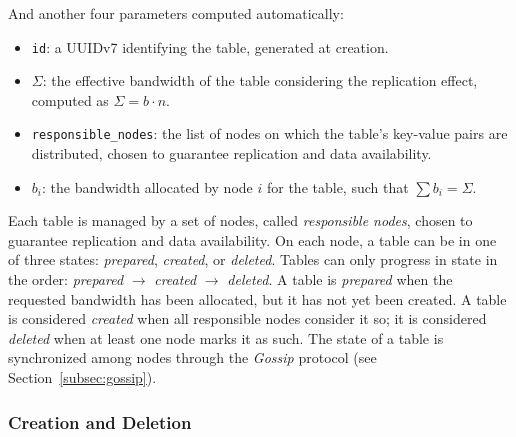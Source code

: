 And another four parameters computed automatically:
\begin{itemize}
    \item \texttt{id}: a UUIDv7 identifying the table, generated at creation.
    \item $\Sigma$: the effective bandwidth of the table considering the replication effect, computed as $\displaystyle \Sigma = b \cdot n$.
    \item \texttt{responsible\_nodes}: the list of nodes on which the table's key-value pairs are distributed, chosen to guarantee replication and data availability.
    \item $b_i$: the bandwidth allocated by node $i$ for the table, such that $\displaystyle \sum b_i = \Sigma$.
\end{itemize}

Each table is managed by a set of nodes, called \emph{responsible nodes}, chosen to guarantee replication and data availability.
On each node, a table can be in one of three states: \emph{prepared}, \emph{created}, or \emph{deleted}.
Tables can only progress in state in the order: \emph{prepared} $\rightarrow$ \emph{created} $\rightarrow$ \emph{deleted}.
A table is \emph{prepared} when the requested bandwidth has been allocated, but it has not yet been created.
A table is considered \emph{created} when all responsible nodes consider it so; it is considered \emph{deleted} when at least one node marks it as such.
The state of a table is synchronized among nodes through the \emph{Gossip} protocol (see Section~\ref{subsec:gossip}).

\subsubsection{Creation and Deletion}
\label{subsubsec:creation-deletion}

